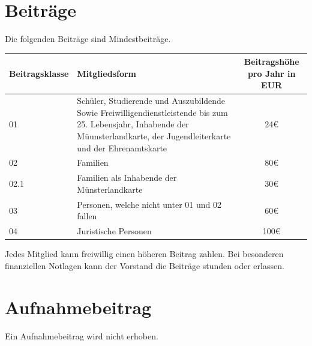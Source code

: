 \documentclass[12pt]{article}
\begin{document}
\section{Beiträge}
Die folgenden Beiträge sind Mindestbeiträge.

\begin{center}
	\begin{tabularx}{\textwidth}{|l|>{\RaggedRight\arraybackslash}X|c|}
		\hline
		\textbf{Beitragsklasse} & \textbf{Mitgliedsform}                                                                                                                                                         & \textbf{Beitragshöhe pro Jahr in EUR} \\
		\hline
		01                      & Schüler, Studierende und Auszubildende Sowie Freiwilligendienstleistende bis zum 25. Lebensjahr, Inhabende der Müunsterlandkarte, der Jugendleiterkarte und der Ehrenamtskarte & 24€                                   \\
		\hline
		02                      & Familien                                                                                                                                                                       & 80€                                   \\
		\hline
		02.1                    & Familien als Inhabende der Münsterlandkarte                                                                                                                                    & 30€                                   \\
		\hline
		03                      & Personen, welche nicht unter 01 und 02 fallen                                                                                                                                  & 60€                                   \\
		\hline
		04                      & Juristische Personen                                                                                                                                                           & 100€                                  \\
		\hline
	\end{tabularx}
\end{center}

Jedes Mitglied kann freiwillig einen höheren Beitrag zahlen.
Bei besonderen finanziellen Notlagen kann der Vorstand die Beiträge stunden oder erlassen.

\section{Aufnahmebeitrag}
Ein Aufnahmebeitrag wird nicht erhoben.
\end{document}
